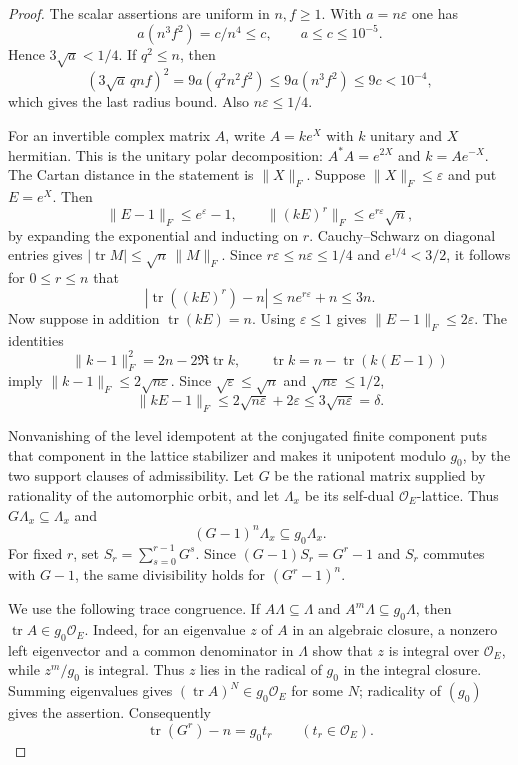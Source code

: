 \begin{proof}
The scalar assertions are uniform in $n,f\ge1$. With $a=n\varepsilon$ one has
\[
 a(n^3f^2)=c/n^4\le c,\qquad a\le c\le10^{-5}.
\]
Hence $3\sqrt a<1/4$. If $q^2\le n$, then
\[
 (3\sqrt a\,qnf)^2=9a(q^2n^2f^2)\le9a(n^3f^2)\le9c<10^{-4},
\]
which gives the last radius bound. Also $n\varepsilon\le1/4$.

For an invertible complex matrix $A$, write $A=ke^X$ with $k$ unitary and $X$ hermitian. This is the unitary polar decomposition: $A^*A=e^{2X}$ and $k=Ae^{-X}$. The Cartan distance in the statement is $\|X\|_F$. Suppose $\|X\|_F\le\varepsilon$ and put $E=e^X$. Then
\[
 \|E-1\|_F\le e^\varepsilon-1,\qquad
 \|(kE)^r\|_F\le e^{r\varepsilon}\sqrt n,
\]
by expanding the exponential and inducting on $r$. Cauchy--Schwarz on diagonal entries gives $|\operatorname{tr}M|\le\sqrt n\,\|M\|_F$. Since $r\varepsilon\le n\varepsilon\le1/4$ and $e^{1/4}<3/2$, it follows for $0\le r\le n$ that
\begin{equation}\label{fr:eq:archtrace}
 |\operatorname{tr}((kE)^r)-n|\le ne^{r\varepsilon}+n\le3n.
\end{equation}
Now suppose in addition $\operatorname{tr}(kE)=n$. Using $\varepsilon\le1$ gives $\|E-1\|_F\le2\varepsilon$. The identities
\[
 \|k-1\|_F^2=2n-2\Re\operatorname{tr}k,
 \qquad \operatorname{tr}k=n-\operatorname{tr}(k(E-1))
\]
imply $\|k-1\|_F\le2\sqrt{n\varepsilon}$. Since $\sqrt\varepsilon\le\sqrt n$ and $\sqrt{n\varepsilon}\le1/2$,
\[
 \|kE-1\|_F\le2\sqrt{n\varepsilon}+2\varepsilon\le3\sqrt{n\varepsilon}=\delta.
\tag{1}
\]

Nonvanishing of the level idempotent at the conjugated finite component puts that component in the lattice stabilizer and makes it unipotent modulo $g_0$, by the two support clauses of admissibility. Let $G$ be the rational matrix supplied by rationality of the automorphic orbit, and let $\Lambda_x$ be its self-dual $\mathcal O_E$-lattice. Thus $G\Lambda_x\subseteq\Lambda_x$ and
\[
 (G-1)^n\Lambda_x\subseteq g_0\Lambda_x.
\]
For fixed $r$, set $S_r=\sum_{s=0}^{r-1}G^s$. Since $(G-1)S_r=G^r-1$ and $S_r$ commutes with $G-1$, the same divisibility holds for $(G^r-1)^n$.

We use the following trace congruence. If $A\Lambda\subseteq\Lambda$ and $A^m\Lambda\subseteq g_0\Lambda$, then $\operatorname{tr}A\in g_0\mathcal O_E$. Indeed, for an eigenvalue $z$ of $A$ in an algebraic closure, a nonzero left eigenvector and a common denominator in $\Lambda$ show that $z$ is integral over $\mathcal O_E$, while $z^m/g_0$ is integral. Thus $z$ lies in the radical of $g_0$ in the integral closure. Summing eigenvalues gives $(\operatorname{tr}A)^N\in g_0\mathcal O_E$ for some $N$; radicality of $(g_0)$ gives the assertion. Consequently
\[
 \operatorname{tr}(G^r)-n=g_0t_r\qquad(t_r\in\mathcal O_E).
\]


\end{proof}
